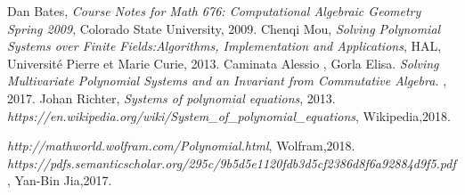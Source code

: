 \documentclass[11pt]{article}
\begin{document}
\begin{thebibliography}{1}
  Dan Bates,
  \textit{Course Notes for Math 676: Computational Algebraic Geometry Spring 2009},
   Colorado State University,
   2009.
  Chenqi Mou,
  \textit{Solving Polynomial Systems over Finite Fields:Algorithms, Implementation and Applications},
   HAL,
   Université Pierre et Marie Curie,
   2013.
  Caminata Alessio , Gorla Elisa.
  \textit{Solving Multivariate Polynomial Systems and an Invariant from Commutative Algebra. },
   2017.
  Johan Richter,
  \textit{Systems of polynomial equations},
   2013.
  \textit{ https://en.wikipedia.org/wiki/System\_of\_polynomial\_equations},
   Wikipedia,2018.
   
  \textit{ http://mathworld.wolfram.com/Polynomial.html},
   Wolfram,2018.
  \textit{ https://pdfs.semanticscholar.org/295c/9b5d5e1120fdb3d5cf2386d8f6a92884d9f5.pdf},
   Yan-Bin Jia,2017.

\end{thebibliography}
\end{document}
